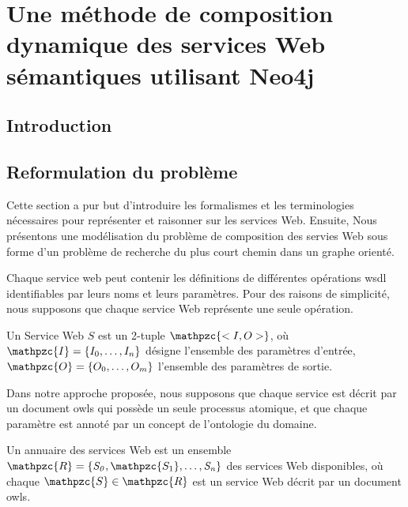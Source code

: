 \chapter{Une méthode de composition dynamique des services Web
  sémantiques utilisant Neo4j}
\label{ch:approach}

\section*{Introduction}
 

\newpage
\section{Reformulation du problème}
\label{sec:ch3/reformulation}

Cette section a pur but d'introduire les formalismes et les
terminologies nécessaires pour représenter et raisonner sur les
services Web. Ensuite, Nous présentons une modélisation du problème de
composition des servies Web sous forme d'un problème de recherche du
plus court chemin dans un graphe orienté.\bigskip

Chaque service web peut contenir les définitions de différentes
opérations \acrshort{wsdl} identifiables par leurs noms et leurs
paramètres. Pour des raisons de simplicité, nous supposons que chaque
service Web représente une seule opération.\medskip

\begin{mydef}
  Un Service Web $S$ est un 2-tuple $\mathpzc{<I,O>}$, où
  $\mathpzc{I}=\{I_0, \dots, I_n\}$ désigne l'ensemble des paramètres
  d'entrée, $\mathpzc{O}=\{O_0, \dots, O_m\}$ l'ensemble des
  paramètres de sortie.
\end{mydef}



Dans notre approche proposée, nous supposons que chaque service est
décrit par un document \acrshort{owls} qui possède un seule processus
atomique, et que chaque paramètre est annoté par un concept de
l'ontologie du domaine.\medskip

\begin{mydef}
  Un annuaire des services Web est un ensemble
  $\mathpzc{R} =\{\mathit{S_0}, \mathpzc{S_1}, \dots,\mathit{S_n}\}$
  des services Web disponibles, où chaque
  $\mathpzc{S} \in \mathpzc{R}$ est un service Web décrit par un
  document \acrshort{owls}.
\end{mydef}

